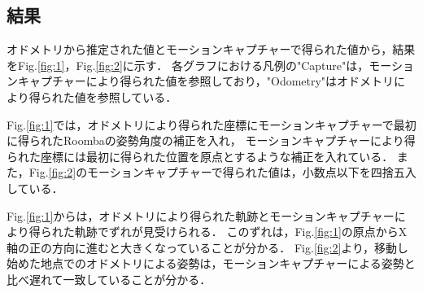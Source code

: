 \documentclass[a4paper,11pt]{jsarticle}
\begin{document}
\subsection{結果}
オドメトリから推定された値とモーションキャプチャーで得られた値から，結果をFig.{\ref{fig:1}}，Fig.{\ref{fig:2}}に示す．
各グラフにおける凡例の"Capture"は，モーションキャプチャーにより得られた値を参照しており，"Odometry"はオドメトリにより得られた値を参照している．\par
Fig.{\ref{fig:1}}では，オドメトリにより得られた座標にモーションキャプチャーで最初に得られたRoombaの姿勢角度の補正を入れ，
モーションキャプチャーにより得られた座標には最初に得られた位置を原点とするような補正を入れている．
また，Fig.{\ref{fig:2}}のモーションキャプチャーで得られた値は，小数点以下を四捨五入している．\par
Fig.{\ref{fig:1}}からは，オドメトリにより得られた軌跡とモーションキャプチャーにより得られた軌跡でずれが見受けられる．
このずれは，Fig.{\ref{fig:1}}の原点からX軸の正の方向に進むと大きくなっていることが分かる．
Fig.{\ref{fig:2}}より，移動し始めた地点でのオドメトリによる姿勢は，モーションキャプチャーによる姿勢と比べ遅れて一致していることが分かる．
\end{document}
